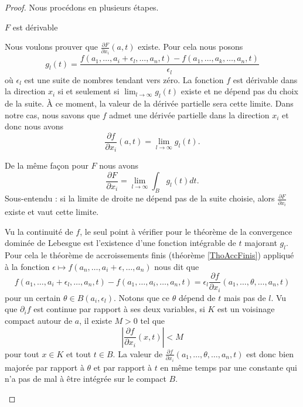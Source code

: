 \begin{proof}
    Nous procédons en plusieurs étapes.
    \begin{subproof}
    \item[\( F\) est dérivable]
            
        Nous voulons prouver que \( \frac{ \partial F }{ \partial x_i }(a,t)\) existe. Pour cela nous posons
        \begin{equation}
            g_l(t)=\frac{ f(a_1,\ldots, a_i+\epsilon_l,\ldots, a_n,t)-f(a_1,\ldots, a_k,\ldots, a_n,t) }{ \epsilon_l }
        \end{equation}
        où \( \epsilon_l\) est une suite de nombres tendant vers zéro. La fonction \( f\) est dérivable dans la direction \( x_i\) si et seulement si \( \lim_{l\to \infty}g_l(t) \) existe et ne dépend pas du choix de la suite. À ce moment, la valeur de la dérivée partielle sera cette limite. Dans notre cas, nous savons que \( f\) admet une dérivée partielle dans la direction \( x_i\) et donc nous avons
        \begin{equation}
            \frac{ \partial f }{ \partial x_i }(a,t)=\lim_{l\to \infty} g_l(t).
        \end{equation}
        
        De la même façon pour \( F\) nous avons
        \begin{equation}
            \frac{ \partial F }{ \partial x_i }=\lim_{l\to \infty} \int_{B}g_l(t)dt.
        \end{equation}
        Sous-entendu : si la limite de droite ne dépend pas de la suite choisie, alors \( \frac{ \partial F }{ \partial x_i }\) existe et vaut cette limite.

        Vu la continuité de \( f\), le seul point à vérifier pour le théorème de la convergence dominée de Lebesgue est l'existence d'une fonction intégrable de \( t\) majorant \( g_l\). Pour cela le théorème de accroissements finis (théorème \ref{ThoAccFinis}) appliqué à la fonction \( \epsilon\mapsto f(a_n,\ldots, a_i+\epsilon,\ldots, a_n)\) nous dit que
        \begin{equation}
            f(a_1,\ldots, a_i+\epsilon_l,\ldots, a_n,t)-f(a_1,\ldots, a_i,\ldots, a_n,t)=\epsilon_l\frac{ \partial f }{ \partial x_i }(a_1,\ldots, \theta,\ldots, a_n,t)
        \end{equation}
        pour un certain \( \theta\in B(a_i,\epsilon_l)\). Notons que ce \( \theta\) dépend de \( t\) mais pas de \( l\). Vu que \( \partial_if\) est continue par rapport à ses deux variables, si \( K\) est un voisinage compact autour de \( a\), il existe \( M>0\) tel que
        \begin{equation}    \label{EqMXqviPC}
            \left| \frac{ \partial f }{ \partial x_i }(x,t) \right| < M
        \end{equation}
        pour tout \( x\in K\) et tout \( t\in B\). La valeur de \( \frac{ \partial f }{ \partial x_i }(a_1,\ldots, \theta,\ldots, a_n,t)\) est donc bien majorée par rapport à \( \theta\) et par rapport à \( t\) en même temps par une constante qui n'a pas de mal à être intégrée sur le compact \( B\).
        

\end{subproof}
\end{proof}
